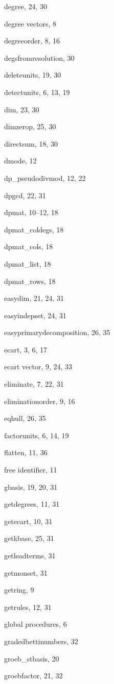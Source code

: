 \begin{theindex}
  \indexspace

  \item degree, 24, 30
  \item degree vectors, 8
  \item degreeorder, 8, 16
  \item degsfromresolution, 30
  \item deleteunits, 19, 30
  \item detectunits, 6, 13, 19
  \item dim, 23, 30
  \item dimzerop, 25, 30
  \item directsum, 18, 30
  \item dmode, 12
  \item dp\_pseudodivmod, 12, 22
  \item dpgcd, 22, 31
  \item dpmat, 10--12, 18
  \item dpmat\_coldegs, 18
  \item dpmat\_cols, 18
  \item dpmat\_list, 18
  \item dpmat\_rows, 18

  \indexspace

  \item easydim, 21, 24, 31
  \item easyindepset, 24, 31
  \item easyprimarydecomposition, 26, 35
  \item ecart, 3, 6, 17
  \item ecart vector, 9, 24, 33
  \item eliminate, 7, 22, 31
  \item eliminationorder, 9, 16
  \item eqhull, 26, 35

  \indexspace

  \item factorunits, 6, 14, 19
  \item flatten, 11, 36
  \item free identifier, 11

  \indexspace

  \item gbasis, 19, 20, 31
  \item getdegrees, 11, 31
  \item getecart, 10, 31
  \item getkbase, 25, 31
  \item getleadterms, 31
  \item getmonset, 31
  \item getring, 9
  \item getrules, 12, 31
  \item global procedures, 6
  \item gradedbettinumbers, 32
  \item groeb\_stbasis, 20
  \item groebfactor, 21, 32


\end{theindex}
